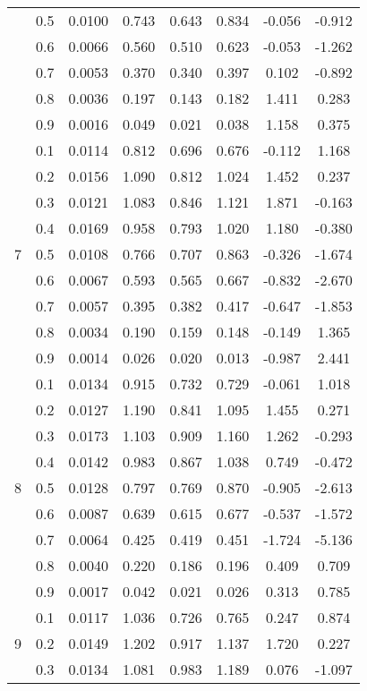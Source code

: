 \documentclass[11pt,a4paper]{report}
\begin{document}
\begin{longtable}{ | c | c || c | c | c | c | c | c | }
 & 0.5 & 0.0100 & 0.743 & 0.643 & 0.834 & -0.056 & -0.912 \\
 & 0.6 & 0.0066 & 0.560 & 0.510 & 0.623 & -0.053 & -1.262 \\
 & 0.7 & 0.0053 & 0.370 & 0.340 & 0.397 & 0.102 & -0.892 \\
 & 0.8 & 0.0036 & 0.197 & 0.143 & 0.182 & 1.411 & 0.283 \\
 & 0.9 & 0.0016 & 0.049 & 0.021 & 0.038 & 1.158 & 0.375 \\
 \hline
\multirow{9}{*}{7} & 0.1 & 0.0114 & 0.812 & 0.696 & 0.676 & -0.112 & 1.168 \\
 & 0.2 & 0.0156 & 1.090 & 0.812 & 1.024 & 1.452 & 0.237 \\
 & 0.3 & 0.0121 & 1.083 & 0.846 & 1.121 & 1.871 & -0.163 \\
 & 0.4 & 0.0169 & 0.958 & 0.793 & 1.020 & 1.180 & -0.380 \\
 & 0.5 & 0.0108 & 0.766 & 0.707 & 0.863 & -0.326 & -1.674 \\
 & 0.6 & 0.0067 & 0.593 & 0.565 & 0.667 & -0.832 & -2.670 \\
 & 0.7 & 0.0057 & 0.395 & 0.382 & 0.417 & -0.647 & -1.853 \\
 & 0.8 & 0.0034 & 0.190 & 0.159 & 0.148 & -0.149 & 1.365 \\
 & 0.9 & 0.0014 & 0.026 & 0.020 & 0.013 & -0.987 & 2.441 \\
 \hline
\multirow{9}{*}{8} & 0.1 & 0.0134 & 0.915 & 0.732 & 0.729 & -0.061 & 1.018 \\
 & 0.2 & 0.0127 & 1.190 & 0.841 & 1.095 & 1.455 & 0.271 \\
 & 0.3 & 0.0173 & 1.103 & 0.909 & 1.160 & 1.262 & -0.293 \\
 & 0.4 & 0.0142 & 0.983 & 0.867 & 1.038 & 0.749 & -0.472 \\
 & 0.5 & 0.0128 & 0.797 & 0.769 & 0.870 & -0.905 & -2.613 \\
 & 0.6 & 0.0087 & 0.639 & 0.615 & 0.677 & -0.537 & -1.572 \\
 & 0.7 & 0.0064 & 0.425 & 0.419 & 0.451 & -1.724 & -5.136 \\
 & 0.8 & 0.0040 & 0.220 & 0.186 & 0.196 & 0.409 & 0.709 \\
 & 0.9 & 0.0017 & 0.042 & 0.021 & 0.026 & 0.313 & 0.785 \\
 \hline
\multirow{9}{*}{9} & 0.1 & 0.0117 & 1.036 & 0.726 & 0.765 & 0.247 & 0.874 \\
 & 0.2 & 0.0149 & 1.202 & 0.917 & 1.137 & 1.720 & 0.227 \\
 & 0.3 & 0.0134 & 1.081 & 0.983 & 1.189 & 0.076 & -1.097 \\

\end{longtable}
\end{document}
